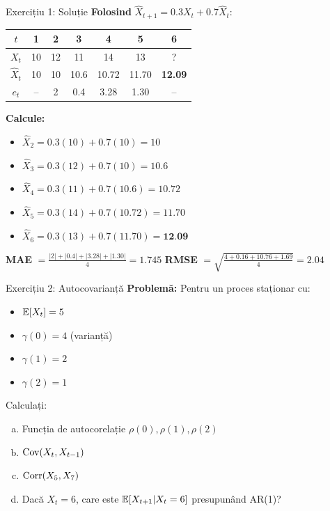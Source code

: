 \documentclass[9pt, aspectratio=169, t]{beamer}
\begin{document}
\begin{frame}{Exercițiu 1: Soluție}
    \textbf{Folosind} $\hat{X}_{t+1} = 0.3 X_t + 0.7 \hat{X}_t$:

    \vspace{0.2cm}

    \begin{center}
    \small
    \begin{tabular}{c|ccccc|c}
        $t$ & 1 & 2 & 3 & 4 & 5 & 6\\
        \hline
        $X_t$ & 10 & 12 & 11 & 14 & 13 & ?\\
        $\hat{X}_t$ & 10 & 10 & 10.6 & 10.72 & 11.70 & \textbf{12.09}\\
        $e_t$ & -- & 2 & 0.4 & 3.28 & 1.30 & --\\
    \end{tabular}
    \end{center}

    \vspace{0.2cm}

    \textbf{Calcule:}
    \begin{itemize}
        \item $\hat{X}_2 = 0.3(10) + 0.7(10) = 10$
        \item $\hat{X}_3 = 0.3(12) + 0.7(10) = 10.6$
        \item $\hat{X}_4 = 0.3(11) + 0.7(10.6) = 10.72$
        \item $\hat{X}_5 = 0.3(14) + 0.7(10.72) = 11.70$
        \item $\hat{X}_6 = 0.3(13) + 0.7(11.70) = \textbf{12.09}$
    \end{itemize}

    \vspace{0.2cm}

    \textbf{MAE} $= \frac{|2|+|0.4|+|3.28|+|1.30|}{4} = 1.745$ \quad \textbf{RMSE} $= \sqrt{\frac{4+0.16+10.76+1.69}{4}} = 2.04$
\end{frame}

\begin{frame}{Exercițiu 2: Autocovarianță}
    \textbf{Problemă:} Pentru un proces staționar cu:
    \begin{itemize}
        \item $\mathbb{E}[X_t] = 5$
        \item $\gamma(0) = 4$ (varianță)
        \item $\gamma(1) = 2$
        \item $\gamma(2) = 1$
    \end{itemize}

    \vspace{0.3cm}

    Calculați:
    \begin{enumerate}[a)]
        \item Funcția de autocorelație $\rho(0), \rho(1), \rho(2)$
        \item $\text{Cov}(X_t, X_{t-1})$
        \item $\text{Corr}(X_5, X_7)$
        \item Dacă $X_t = 6$, care este $\mathbb{E}[X_{t+1} | X_t = 6]$ presupunând AR(1)?
    \end{enumerate}
\end{frame}
\end{document}
